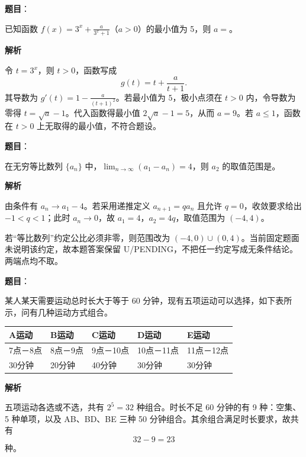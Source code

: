 \begin{answer}

\textbf{题目}：

已知函数 $f(x)=3^x+\frac a{3^x+1}$（$a>0$）的最小值为 5，则 $a=$\gkblank{}。

\textbf{解析}

令 $t=3^x$，则 $t>0$，函数写成
\nopagebreak[4]
\[
g(t)=t+\frac a{t+1}.
\]
其导数为 \(g'(t)=1-\frac{a}{(t+1)^2}\)。若最小值为 $5$，极小点须在 $t>0$ 内，令导数为零得 $t=\sqrt a-1$。代入函数得最小值 $2\sqrt a-1=5$，从而 $a=9$。若 $a\le1$，函数在 $t>0$ 上无取得的最小值，不符合题设。


\end{answer}
\begin{answer}

\textbf{题目}：

在无穷等比数列 $\{a_n\}$ 中，$\lim_{n\to\infty}(a_1-a_n)=4$，则 $a_2$ 的取值范围是\gkblank{}。

\textbf{解析}

由条件有 \(a_n\to a_1-4\)。若采用递推定义 \(a_{n+1}=qa_n\) 且允许 $q=0$，收敛要求给出 $-1<q<1$；此时 $a_n\to0$，故 $a_1=4$，$a_2=4q$，取值范围为 $(-4,4)$。

若“等比数列”约定公比必须非零，则范围改为 $(-4,0)\cup(0,4)$。当前固定题面未说明该约定，故本题答案保留 U/PENDING，不把任一约定写成无条件结论。两端点均不取。


\end{answer}
\begin{answer}

\textbf{题目}：

某人某天需要运动总时长大于等于 60 分钟，现有五项运动可以选择，如下表所示，问有几种运动方式组合\gkblank{}。

\begin{center}
\begin{tabular}{lllll}
\toprule
A运动 & B运动 & C运动 & D运动 & E运动 \\
\midrule
7点－8点 & 8点－9点 & 9点－10点 & 10点－11点 & 11点－12点 \\
30分钟 & 20分钟 & 40分钟 & 30分钟 & 30分钟 \\
\bottomrule
\end{tabular}
\end{center}

\textbf{解析}

五项运动各选或不选，共有 \(2^5=32\) 种组合。时长不足 60 分钟的有 9 种：空集、5 种单项，以及 AB、BD、BE 三种 50 分钟组合。其余组合满足时长要求，故共有
\nopagebreak[4]
\[
32-9=23
\]
种。


\end{answer}

